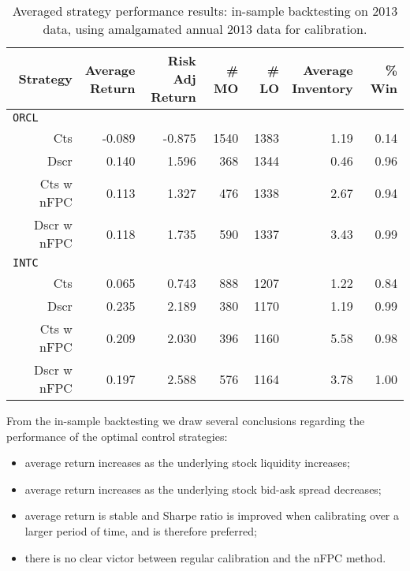 \begin{table}
\centering
{}
\setlength{\tabcolsep}{9pt}
\begin{tabular}{@{} *{7}{r} @{}}
\toprule
Strategy & \cellbreak{t}{r}{Average \\ Return} & \cellbreak{t}{r}{Risk Adj \\ Return} & \cellbreak{t}{r}{\# MO \\ \hphantom{Risk Adj}} & \cellbreak{t}{r}{\# LO \\ \hphantom{Risk Adj}} & \cellbreak{t}{r}{Average \\ Inventory} & \cellbreak{t}{r}{\% Win \\ \hphantom{Risk Adj}} \\
\midrule
\multicolumn{7}{l}{\texttt{ORCL}} \\ 
Cts & -0.089 & -0.875 & 1540 & 1383 & 1.19 & 0.14  \\ 
Dscr & 0.140 & 1.596 & 368 & 1344 & 0.46 & 0.96 \\ 
Cts w nFPC & 0.113 & 1.327 & 476 & 1338 & 2.67 & 0.94 \\ 
Dscr w nFPC & 0.118 & 1.735 & 590 & 1337 & 3.43 & 0.99 \\[2ex]
\multicolumn{7}{l}{\texttt{INTC}} \\ 
Cts & 0.065 & 0.743 & 888 & 1207 & 1.22 & 0.84 \\
Dscr & 0.235 & 2.189 & 380 & 1170 & 1.19 & 0.99 \\
Cts w nFPC & 0.209 & 2.030 & 396 & 1160 & 5.58 & 0.98 \\
Dscr w nFPC & 0.197 & 2.588 & 576 & 1164 & 3.78 & 1.00 \\
\bottomrule
\end{tabular}
\caption[In-sample backtesting performance using annual calibration]{Averaged strategy performance results: in-sample backtesting on 2013 data, using amalgamated annual 2013 data for calibration.}
\label{tbl:IS_annual}
\end{table}

From the in-sample backtesting we draw several conclusions regarding the performance of the optimal control strategies:
\begin{itemize}
\item average return increases as the underlying stock liquidity increases;
\item average return increases as the underlying stock bid-ask spread decreases;
\item average return is stable and Sharpe ratio is improved when calibrating over a larger period of time, and is therefore preferred;
\item there is no clear victor between regular calibration and the nFPC method.
\end{itemize}

